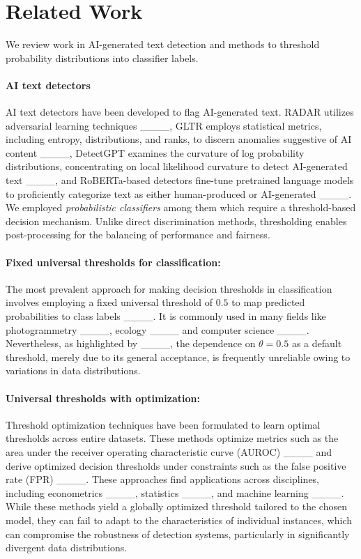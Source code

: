 \section{Related Work}
We review work in AI-generated text detection and methods to threshold probability distributions into classifier labels.

\paragraph{AI text detectors}
AI text detectors have been developed to flag AI-generated text. RADAR utilizes adversarial learning techniques ____, GLTR employs statistical metrics, including entropy, distributions, and ranks, to discern anomalies suggestive of AI content ____, DetectGPT examines the curvature of log probability distributions, concentrating on local likelihood curvature to detect AI-generated text ____, and RoBERTa-based detectors fine-tune pretrained language models to proficiently categorize text as either human-produced or AI-generated ____. We employed \textit{probabilistic classifiers} among them which require a threshold-based decision mechanism. Unlike direct discrimination methods, thresholding enables post-processing for the balancing of performance and fairness.


\paragraph{Fixed universal thresholds for classification:}\label{method1:static} 
The most prevalent approach for making decision thresholds in classification involves employing a fixed universal threshold of $0.5$ to map predicted probabilities to class labels ____. It is commonly used in many fields like photogrammetry ____, ecology ____ and computer science ____. Nevertheless, as highlighted by ____, the dependence on $\theta = 0.5$ as a default threshold, merely due to its general acceptance, is frequently unreliable owing to variations in data distributions. 

\paragraph{Universal thresholds with optimization:} Threshold optimization techniques have been formulated to learn optimal thresholds across entire datasets. These methods optimize metrics such as the area under the receiver operating characteristic curve (AUROC) ____ and derive optimized decision thresholds under constraints such as the false positive rate (FPR) ____. These approaches find applications across disciplines, including econometrics ____, statistics ____, and machine learning ____. While these methods yield a globally optimized threshold tailored to the chosen model, they can fail to adapt to the characteristics of individual instances, which can compromise the robustness of detection systems, particularly in significantly divergent data distributions.


